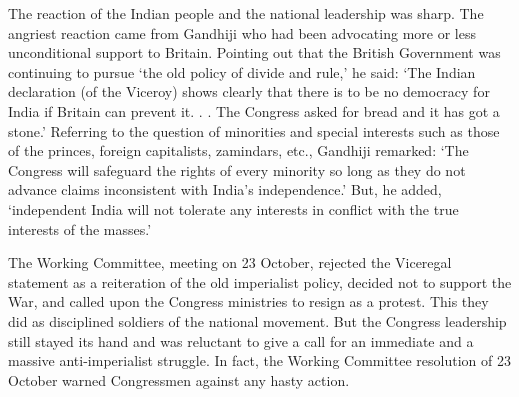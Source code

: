 The reaction of the Indian people and the national leadership was sharp. The angriest reaction came from Gandhiji who had been advocating more or less unconditional support to Britain. Pointing out that the British Government was continuing to pursue ‘the old policy of divide and rule,’ he said: ‘The Indian declaration (of the Viceroy) shows clearly that there is to be no democracy for India if Britain can prevent it. . . The Congress asked for bread and it has got a stone.’ Referring to the question of minorities and special interests such as those of the princes, foreign capitalists, zamindars, etc., Gandhiji remarked: ‘The Congress will safeguard the rights of every minority so long as they do not advance claims inconsistent with India’s independence.’ But, he added, ‘independent India will not tolerate any interests in conflict with the true interests of the masses.’ 

The Working Committee, meeting on 23 October, rejected the Viceregal statement as a reiteration of the old imperialist policy, decided not to support the War, and called upon the Congress ministries to resign as a protest. This they did as disciplined soldiers of the national movement. But the Congress leadership still stayed its hand and was reluctant to give a call for an immediate and a massive anti-imperialist struggle. In fact, the Working Committee resolution of 23 October warned Congressmen against any hasty action. 

